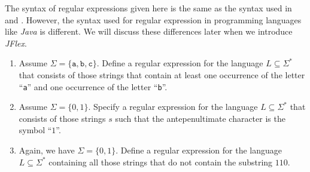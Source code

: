 \remarkEng 
The syntax of regular expressions given here is the same as the syntax used in  \cite{hopcroft:06}
and \cite{sipser:2006}.   However, the syntax used for regular expression in programming languages
like  \textsl{Java} is different.  We will discuss these differences later when we introduce \textsl{JFlex}.

\exerciseEng
\renewcommand{\labelenumi}{(\alph{enumi})}
\begin{enumerate}
\item Assume $\Sigma = \{ \mathtt{a}, \mathtt{b}, \mathtt{c} \}$.  Define a regular expression for the language
      $L \subseteq \Sigma^*$ that consists of those strings that contain at least one occurrence of
      the letter ``\texttt{a}'' and one occurrence of the letter ``\texttt{b}''.
\item Assume $\Sigma = \{ 0, 1 \}$.   Specify a regular expression for the language 
      $L \subseteq \Sigma^*$ that consists of those strings $s$ such that the antepenultimate
      character is the symbol  ``$1$''.
\item Again, we have $\Sigma = \{ 0, 1 \}$.   Define a regular expression for the language
      $L \subseteq \Sigma^*$ containing all those strings that do not contain the substring  $110$.



\end{enumerate}

